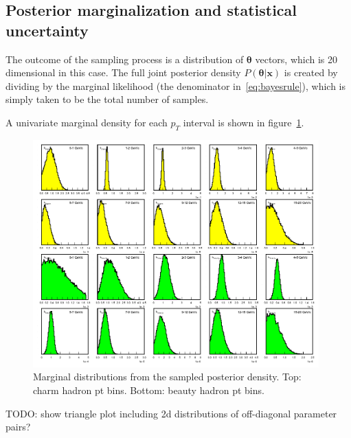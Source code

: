\documentclass[12pt]{article}
\newcommand{\pt}{p_T}
\newcommand{\xvec}{\mathbf{x}}
\newcommand{\thetavec}{\mathbf{\theta}}
\newcommand{\post}{P(\thetavec|\xvec)}
\begin{document}
\subsection{Posterior marginalization and statistical uncertainty} \label{sec:marg}
The outcome of the sampling process is a distribution of $\thetavec$ vectors, which is 20 dimensional in this case. The full joint posterior density $\post$ is created by dividing by the marginal likelihood (the denominator in~\ref{eq:bayesrule}), which is simply taken to be the total number of samples.

A univariate marginal density for each $\pt$ interval is shown in figure~\ref{fig:post}.
\begin{figure}[htb]
  \begin{center}
    \includegraphics[width=0.98\textwidth]{AuAu200MB/2/posterior}
  \end{center}
  \caption{Marginal distributions from the sampled posterior density. Top: charm hadron pt bins. Bottom: beauty hadron pt bins.}
  \label{fig:post}
\end{figure}
TODO: show triangle plot including 2d distributions of off-diagonal parameter pairs?
\end{document}
